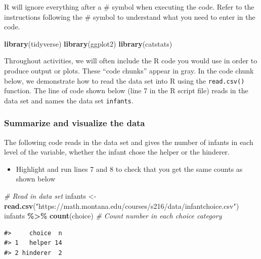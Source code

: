\documentclass[
]{report}
\newenvironment{Shaded}{\begin{snugshade}}{\end{snugshade}}
\newcommand{\CommentTok}[1]{\textcolor[rgb]{0.56,0.35,0.01}{\textit{#1}}}
\newcommand{\FunctionTok}[1]{\textcolor[rgb]{0.13,0.29,0.53}{\textbf{#1}}}
\newcommand{\NormalTok}[1]{#1}
\newcommand{\OtherTok}[1]{\textcolor[rgb]{0.56,0.35,0.01}{#1}}
\newcommand{\SpecialCharTok}[1]{\textcolor[rgb]{0.81,0.36,0.00}{\textbf{#1}}}
\newcommand{\StringTok}[1]{\textcolor[rgb]{0.31,0.60,0.02}{#1}}
\providecommand{\tightlist}{%
  \setlength{\itemsep}{0pt}\setlength{\parskip}{0pt}}
\begin{document}
R will ignore everything after a \# symbol when executing the code. Refer to the instructions following the \# symbol to understand what you need to enter in the code.

\begin{Shaded}
\begin{Highlighting}[]
\FunctionTok{library}\NormalTok{(tidyverse)}
\FunctionTok{library}\NormalTok{(ggplot2)}
\FunctionTok{library}\NormalTok{(catstats)}
\end{Highlighting}
\end{Shaded}

Throughout activities, we will often include the R code you would use in order to produce output or plots. These ``code chunks'' appear in gray. In the code chunk below, we demonstrate how to read the data set into R using the \texttt{read.csv()} function. The line of code shown below (line 7 in the R script file) reads in the data set and names the data set \texttt{infants}.

\subsubsection*{Summarize and visualize the data}\label{summarize-and-visualize-the-data}

The following code reads in the data set and gives the number of infants in each level of the variable, whether the infant chose the helper or the hinderer.

\begin{itemize}
\tightlist
\item
  Highlight and run lines 7 and 8 to check that you get the same counts as shown below
\end{itemize}

\begin{Shaded}
\begin{Highlighting}[]
 \CommentTok{\# Read in data set}
\NormalTok{infants }\OtherTok{\textless{}{-}} \FunctionTok{read.csv}\NormalTok{(}\StringTok{"https://math.montana.edu/courses/s216/data/infantchoice.csv"}\NormalTok{)}
\NormalTok{infants }\SpecialCharTok{\%\textgreater{}\%} \FunctionTok{count}\NormalTok{(choice)  }\CommentTok{\# Count number in each choice category}
\end{Highlighting}
\end{Shaded}

\begin{verbatim}
#>     choice  n
#> 1   helper 14
#> 2 hinderer  2
\end{verbatim}
\end{document}
